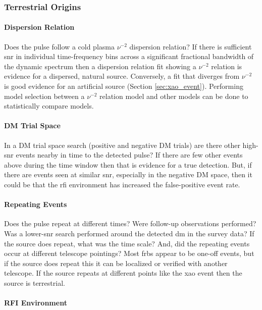 \documentclass[a4paper,fleqn,usenatbib]{mnras}
\begin{document}
\subsubsection{Terrestrial Origins}

\paragraph{Dispersion Relation}

Does the pulse follow a cold plasma $\nu^{-2}$ dispersion relation? If there is
sufficient \gls{snr} in individual time-frequency bins across a significant
fractional bandwidth of the dynamic spectrum then a dispersion relation fit
showing a $\nu^{-2}$ relation is evidence for a dispersed, natural source.
Conversely, a fit that diverges from $\nu^{-2}$ is good evidence for an
artificial source (Section \ref{sec:xao_event}). Performing model selection
between a $\nu^{-2}$ relation model and other models can be done to
statistically compare models.

\paragraph{DM Trial Space}

In a DM trial space search (positive and negative DM trials) are there other
high-\gls{snr} events nearby in time to the detected pulse? If there are few
other events above during the time window then that is evidence for a true
detection. But, if there are events seen at similar \gls{snr}, especially in the
negative DM space, then it could be that the \gls{rfi} environment has
increased the false-positive event rate.

\paragraph{Repeating Events}

Does the pulse repeat at different times? Were follow-up observations performed?
Was a lower-\gls{snr} search performed around the detected \gls{dm} in the
survey data? If the source does repeat, what was the time scale? And, did the
repeating events occur at different telescope pointings? Most \glspl{frb} appear
to be one-off events, but if the source does repeat this it can be localized or
verified with another telescope. If the source repeats at different points like
the \gls{xao} event then the source is terrestrial.

\paragraph{RFI Environment}
\end{document}
